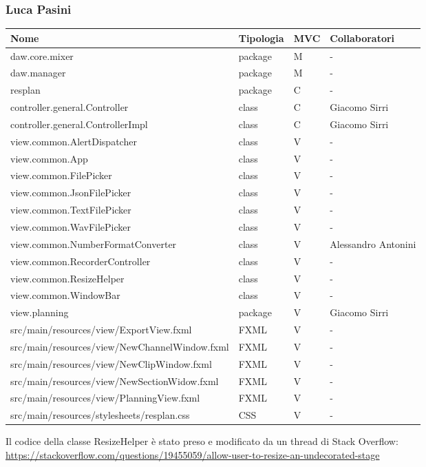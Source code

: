 \documentclass[a4paper,12pt]{report}
\begin{document}
\subsubsection{Luca Pasini}
\begin{center}
\begin{longtable}{| m{22.5em} | m{2cm}| m{1cm} | m{2.5cm} |} 
 \hline
  Nome & Tipologia & MVC & Collaboratori \\ [0.5ex] 
\hline
daw.core.mixer & package & M & - \\
\hline
daw.manager & package & M & - \\
\hline
resplan & package & C & - \\
\hline
controller.general.Controller & class & C & Giacomo Sirri \\
\hline
controller.general.ControllerImpl & class & C & Giacomo Sirri \\
\hline
view.common.AlertDispatcher & class & V & - \\
\hline
view.common.App & class & V & - \\
\hline
view.common.FilePicker & class & V & - \\
\hline
view.common.JsonFilePicker & class & V & - \\
\hline
view.common.TextFilePicker & class & V & - \\
\hline
view.common.WavFilePicker & class & V & - \\
\hline 
view.common.NumberFormatConverter & class & V & Alessandro Antonini \\
\hline
view.common.RecorderController & class & V & - \\
\hline
view.common.ResizeHelper & class & V & - \\
\hline
view.common.WindowBar & class & V & - \\
\hline
view.planning & package & V & Giacomo Sirri \\
\hline
src/main/resources/view/ExportView.fxml & FXML & V & - \\
\hline
src/main/resources/view/NewChannelWindow.fxml & FXML & V & - \\
\hline
src/main/resources/view/NewClipWindow.fxml & FXML & V & - \\
\hline
src/main/resources/view/NewSectionWidow.fxml & FXML & V & - \\
\hline
src/main/resources/view/PlanningView.fxml & FXML & V & - \\
\hline
src/main/resources/stylesheets/resplan.css & CSS & V & - \\
\hline
\end{longtable}
\end{center}
Il codice della classe ResizeHelper è stato preso e modificato da un thread di Stack Overflow: 
\hyperlink{https://stackoverflow.com/questions/19455059/allow-user-to-resize-an-undecorated-stage}{https://stackoverflow.com/questions/19455059/allow-user-to-resize-an-undecorated-stage}
\endsubsubsection
\end{document}
